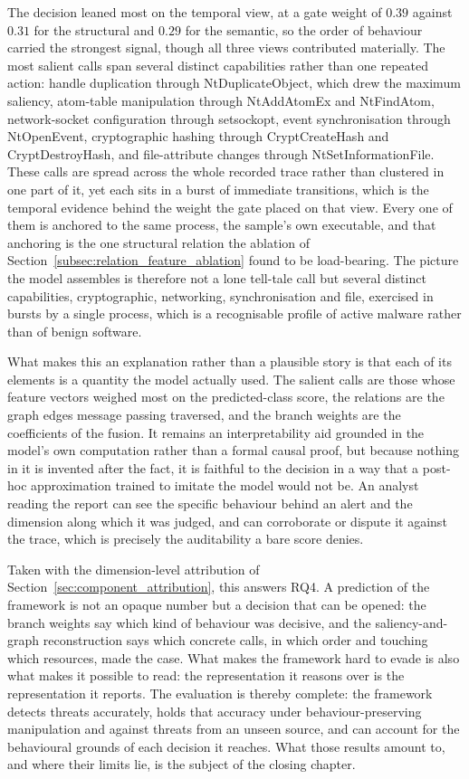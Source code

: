 \documentclass[%
    BCOR=10mm,
    DIV=13,
    toc=bibliography,
    toc=listof,
    oneside,
    12pt,
]{scrbook}
\begin{document}
The decision leaned most on the temporal view, at a gate weight of $0.39$ against
$0.31$ for the structural and $0.29$ for the semantic, so the order of behaviour
carried the strongest signal, though all three views contributed materially. The
most salient calls span several distinct capabilities rather than one repeated
action: handle duplication through NtDuplicateObject, which drew the maximum
saliency, atom-table manipulation through NtAddAtomEx and NtFindAtom, network-socket
configuration through setsockopt, event synchronisation through NtOpenEvent,
cryptographic hashing through CryptCreateHash and CryptDestroyHash, and
file-attribute changes through NtSetInformationFile. These calls are spread across
the whole recorded trace rather than clustered in one part of it, yet each sits in a
burst of immediate transitions, which is the temporal evidence behind the weight the
gate placed on that view. Every one of them is anchored to the same process, the
sample's own executable, and that anchoring is the one structural relation the
ablation of Section~\ref{subsec:relation_feature_ablation} found to be load-bearing.
The picture the model assembles is therefore not a lone tell-tale call but several
distinct capabilities, cryptographic, networking, synchronisation and file,
exercised in bursts by a single process, which is a recognisable profile of active
malware rather than of benign software.

What makes this an explanation rather than a plausible story is that each of its
elements is a quantity the model actually used. The salient calls are those whose
feature vectors weighed most on the predicted-class score, the relations are the
graph edges message passing traversed, and the branch weights are the coefficients
of the fusion. It remains an interpretability aid grounded in the model's own
computation rather than a formal causal proof, but because nothing in it is invented
after the fact, it is faithful to the decision in a way that a post-hoc
approximation trained to imitate the model would not be. An analyst reading the
report can see the specific behaviour behind an alert and the dimension along which
it was judged, and can corroborate or dispute it against the trace, which is
precisely the auditability a bare score denies.

Taken with the dimension-level attribution of
Section~\ref{sec:component_attribution}, this answers RQ4. A prediction of the
framework is not an opaque number but a decision that can be opened: the branch
weights say which kind of behaviour was decisive, and the saliency-and-graph
reconstruction says which concrete calls, in which order and touching which
resources, made the case. What makes the framework hard to evade is also what makes
it possible to read: the representation it reasons over is the representation it
reports. The evaluation is thereby complete: the framework detects threats
accurately, holds that accuracy under behaviour-preserving manipulation and against
threats from an unseen source, and can account for the behavioural grounds of each
decision it reaches. What those results amount to, and where their limits lie, is
the subject of the closing chapter.
\end{document}
